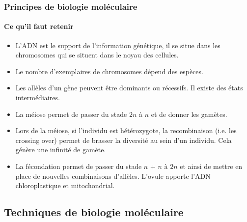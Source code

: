 \begin{frame}
\frametitle{Principes de biologie moléculaire}
\framesubtitle{Ce qu'il faut retenir}

\begin{itemize}[<+->]
\item L'ADN est le support de l'information génétique, il se situe dans les chromosomes qui se situent dans le noyau des cellules.

\item Le nombre d'exemplaires de chromosomes dépend des espèces.

\item Les allèles d'un gène peuvent être dominants ou récessifs. Il existe des états intermédiaires. %

\item La méiose permet de passer du stade $2n$ à $n$ et de donner les gamètes.

\item Lors de la méiose, si l'individu est hétérozygote, la recombinaison (i.e. les crossing over) permet de brasser la diversité au sein d'un individu. Cela génère une infinité de gamète.

\item La fécondation permet de passer du stade $n$ + $n$ à $2n$ et ainsi de mettre en place de nouvelles combinaisons d'allèles. L'ovule apporte l'ADN chloroplastique et mitochondrial.

\end{itemize}


\end{frame}

\subsection{Techniques de biologie moléculaire}

